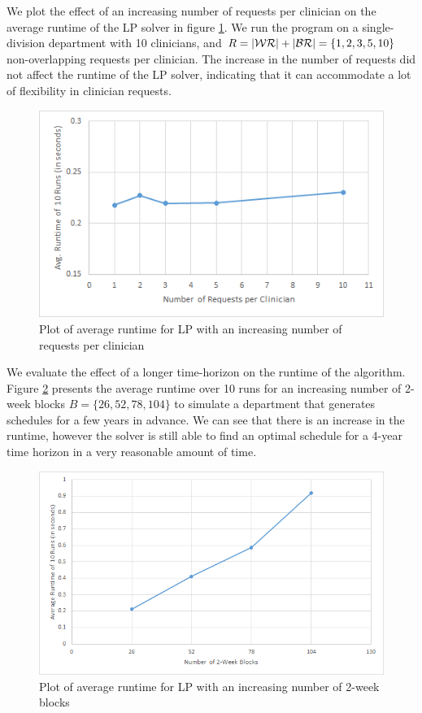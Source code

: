 We plot the effect of an increasing number of requests per clinician on the average runtime of the LP solver in figure \ref{fig:avg-runtime-requests}. We run the program on a single-division department with 10 clinicians, and $R = \abs{\mathcal{WR}} + \abs{\mathcal{BR}} = \{1, 2, 3, 5, 10\}$ non-overlapping requests per clinician. The increase in the number of requests did not affect the runtime of the LP solver, indicating that it can accommodate a lot of flexibility in clinician requests. \\

\begin{figure}[h]
	\centering
	\includegraphics[scale=.7]{fig/avg_runtime_requests}
	\caption{Plot of average runtime for LP with an increasing number of requests per clinician}
	\label{fig:avg-runtime-requests}
\end{figure}

We evaluate the effect of a longer time-horizon on the runtime of the algorithm. Figure \ref{fig:avg-runtime-blocks} presents the average runtime over 10 runs for an increasing number of 2-week blocks $B = \{26, 52, 78, 104\}$ to simulate a department that generates schedules for a few years in advance. We can see that there is an increase in the runtime, however the solver is still able to find an optimal schedule for a 4-year time horizon in a very reasonable amount of time.

\begin{figure}[h]
	\centering
	\includegraphics[scale=.7]{fig/avg_runtime_blocks}
	\caption{Plot of average runtime for LP with an increasing number of 2-week blocks}
	\label{fig:avg-runtime-blocks}
\end{figure}
